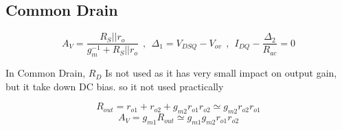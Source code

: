 \subsection{Common Drain}
$$ A_V = \dfrac{R_S || r_o}{g_m^{-1} + R_S||r_o} ~~ , ~~  {\Delta}_1 = V_{DSQ} - V_{ov} ~~ , ~~ I_{DQ} - \frac{{\Delta}_2}{R_{ac}} = 0 $$
\par
\setlength{\parindent}{0.5cm} %
In Common Drain, $R_D$ Is not used as it has very small impact on output gain, but it take down DC bias. so it not used practically
\lipsum[1-4]
\setlength{\parindent}{0.0cm} 
\begin{minipage}[b]{.5\textwidth}
$$ R_{out} = r_{o1} + r_{o2} + g_{m2} r_{o1} r_{o2} \simeq  g_{m2} r_{o2} r_{o1} $$
$$ A_V = g_{m1} R_{out} \simeq g_{m1} g_{m2} r_{o1} r_{o2}$$
\par ~\\
\centering

\end{minipage}%
\noindent
\setlength{\parindent}{0.0cm} 
\hspace*{-\parindent}%
\begin{minipage}[b]{.5\textwidth}
\raggedleft

\end{minipage}%
